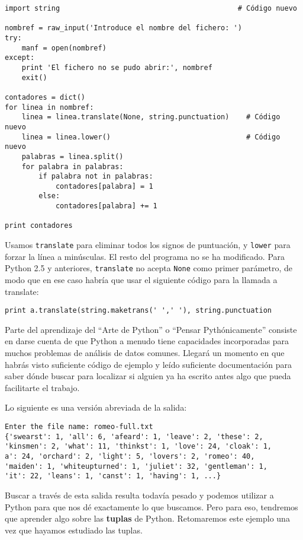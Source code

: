 \beforeverb
\begin{verbatim}
import string                                          # Código nuevo

nombref = raw_input('Introduce el nombre del fichero: ')
try:
    manf = open(nombref)
except:
    print 'El fichero no se pudo abrir:', nombref
    exit()

contadores = dict()
for linea in nombref:
    linea = linea.translate(None, string.punctuation)    # Código nuevo
    linea = linea.lower()                                # Código nuevo
    palabras = linea.split()
    for palabra in palabras:
        if palabra not in palabras:
            contadores[palabra] = 1
        else:
            contadores[palabra] += 1

print contadores
\end{verbatim}
\afterverb
%
Usamos {\tt translate} para eliminar todos los signos de puntuación, y {\tt lower} para
forzar la línea a minúsculas. El resto del programa no se ha modificado.
Para Python 2.5 y anteriores, {\tt translate} no
acepta {\tt None} como primer parámetro, de modo que en ese caso
habría que usar el siguiente código para la llamada a translate:

\beforeverb
\begin{verbatim}
print a.translate(string.maketrans(' ',' '), string.punctuation
\end{verbatim}
\afterverb
%
Parte del aprendizaje del ``Arte de Python'' o ``Pensar Pythónicamente''
consiste en darse cuenta de que Python
a menudo tiene capacidades incorporadas para muchos problemas de análisis
de datos comunes. Llegará un momento en que habrás visto suficiente código de ejemplo y leído
suficiente documentación para saber dónde buscar para localizar si alguien
ya ha escrito antes algo que pueda facilitarte el trabajo.

Lo siguiente es una versión abreviada de la salida:

\beforeverb
\begin{verbatim}
Enter the file name: romeo-full.txt
{'swearst': 1, 'all': 6, 'afeard': 1, 'leave': 2, 'these': 2, 
'kinsmen': 2, 'what': 11, 'thinkst': 1, 'love': 24, 'cloak': 1, 
a': 24, 'orchard': 2, 'light': 5, 'lovers': 2, 'romeo': 40, 
'maiden': 1, 'whiteupturned': 1, 'juliet': 32, 'gentleman': 1, 
'it': 22, 'leans': 1, 'canst': 1, 'having': 1, ...}
\end{verbatim}
\afterverb
%
Buscar a través de esta salida resulta todavía pesado y podemos utilizar
a Python para que nos dé exactamente lo que buscamos. Pero para eso,
tendremos que aprender algo sobre las {\bf tuplas} de Python.
Retomaremos este ejemplo una vez que hayamos estudiado las tuplas.

